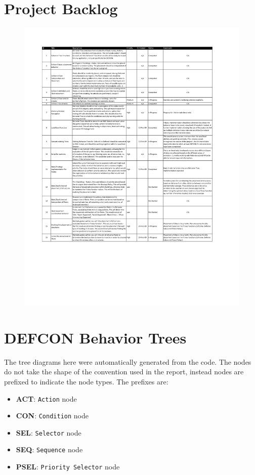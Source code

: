     \newpage
        
    \section*{Project Backlog}
    \label{app:backlog}
        \begin{figure}        
        \includegraphics[bb=1.5in 2.0in 7.5in 9in,page=1]{backlog}
        \end{figure}
        
    \newpage
        
    \section*{DEFCON Behavior Trees}
    \label{app:defconbts}
    The tree diagrams here were automatically generated from the code. The nodes do not take the shape of the convention used in the report, instead nodes are prefixed to indicate the node types. The prefixes are:
    \begin{itemize}
    \item \textbf{ACT}: \texttt{Action} node
    \item \textbf{CON}: \texttt{Condition} node
    \item \textbf{SEL}: \texttt{Selector} node
    \item \textbf{SEQ}: \texttt{Sequence} node
    \item \textbf{PSEL}: \texttt{Priority Selector} node
    \end{itemize}
       
